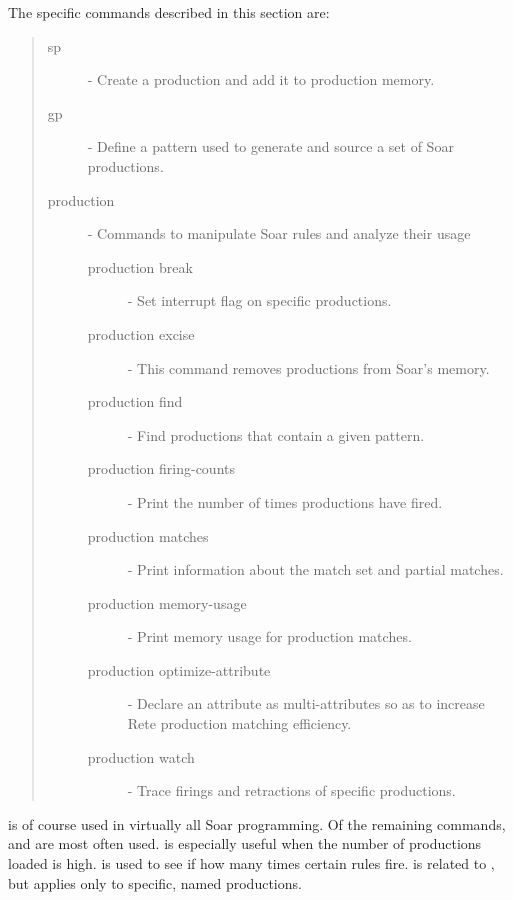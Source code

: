 
The specific commands described in this section are:

\begin{quote}
	\begin{description}
		\item[sp] - Create a production and add it to production memory.
		\item[gp] - Define a pattern used to generate and source a set of Soar productions.
		\item[production] - Commands to manipulate Soar rules and analyze their usage
		\begin{description}
			\item[production break] - Set interrupt flag on specific productions.
			\item[production excise] - This command removes productions from Soar's memory.
			\item[production find] - Find productions that contain a given pattern.
			\item[production firing-counts] - Print the number of times productions have fired.
			\item[production matches] - Print information about the match set and partial matches.
			\item[production memory-usage] - Print memory usage for production matches.
			\item[production optimize-attribute] - Declare an attribute as multi-attributes so as to increase Rete production matching efficiency.
			\item[production watch] - Trace firings and retractions of specific productions.
		\end{description}
	\end{description}
\end{quote}

 is of course used in virtually all Soar programming. Of the remaining commands,  and  are most often used.  is especially useful when the number of productions loaded is high.  is used to see if how many times certain rules fire.  is related to , but applies only to specific, named productions.

